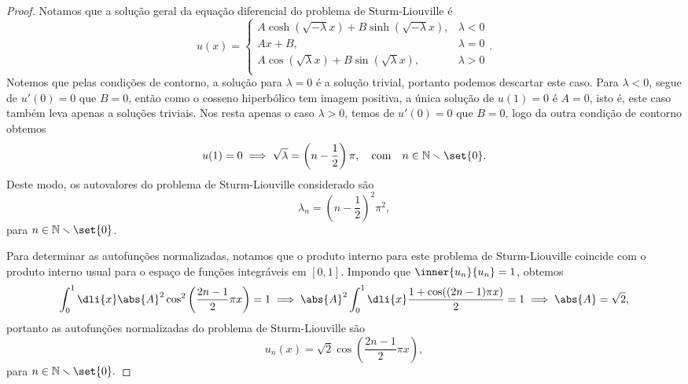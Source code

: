 \begin{proof}
    Notamos que a solução geral da equação diferencial do problema de Sturm-Liouville é
    \begin{equation*}
        u(x) = \begin{cases}
            A\cosh(\sqrt{-\lambda}x) + B\sinh(\sqrt{-\lambda}x), & \lambda < 0\\
            Ax + B, &\lambda = 0\\
            A\cos(\sqrt{\lambda}x)+ B\sin(\sqrt{\lambda}x),&\lambda > 0\\
        \end{cases}.
    \end{equation*}
    Notemos que pelas condições de contorno, a solução para \(\lambda = 0\) é a solução trivial, portanto podemos descartar este caso. Para \(\lambda < 0\), segue de \(u'(0) = 0\) que \(B = 0\), então como o cosseno hiperbólico tem imagem positiva, a única solução de \(u(1) = 0\) é \(A = 0\), isto é, este caso também leva apenas a soluções triviais. Nos resta apenas o caso \(\lambda > 0\), temos de \(u'(0) = 0\) que \(B = 0\), logo da outra condição de contorno obtemos
    \begin{equation*}
        u(1) = 0 \implies \sqrt{\lambda} = \left(n-\frac12\right)\pi,\quad\text{com}\quad n \in \mathbb{N}\smallsetminus\set{0}.
    \end{equation*}
    Deste modo, os autovalores do problema de Sturm-Liouville considerado são
    \begin{equation*}
        \lambda_n = \left(n-\frac12\right)^2\pi^2,
    \end{equation*}
    para \(n \in \mathbb{N}\smallsetminus\set{0}\).

    Para determinar as autofunções normalizadas, notamos que o produto interno para este problema de Sturm-Liouville coincide com o produto interno usual para o espaço de funções integráveis em \([0,1]\). Impondo que \(\inner{u_n}{u_n} = 1\), obtemos
    \begin{equation*}
        \int_{0}^{1} \dli{x}\abs{A}^2 \cos^2\left(\frac{2n-1}{2}\pi x\right) = 1 \implies \abs{A}^2 \int_{0}^{1}\dli{x} \frac{1 + \cos((2n-1)\pi x)}{2} = 1 \implies \abs{A} = \sqrt{2},
    \end{equation*}
    portanto as autofunções normalizadas do problema de Sturm-Liouville são
    \begin{equation*}
        u_n(x) = \sqrt{2} \cos\left(\frac{2n-1}{2}\pi x\right),
    \end{equation*}
    para \(n \in \mathbb{N}\smallsetminus\set{0}.\)
\end{proof}

